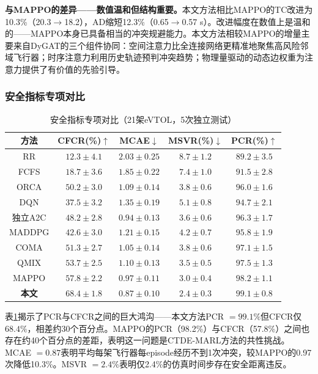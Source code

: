 \documentclass[12pt,a4paper,UTF8]{ctexart}
\begin{document}
\textbf{与MAPPO的差异——数值温和但结构重要。}本文方法相比MAPPO的TC改进为10.3\%（20.3$\to$18.2），AD缩短12.3\%（0.65$\to$0.57 s）。改进幅度在数值上是温和的——MAPPO本身已具备相当的冲突规避能力。本文方法相较MAPPO的增量主要来自DyGAT的三个组件协同：空间注意力比全连接网络更精准地聚焦高风险邻域飞行器；时序注意力利用历史轨迹预判冲突趋势；物理量驱动的动态边权重为注意力提供了有价值的先验引导。

\subsubsection{安全指标专项对比}

\begin{table}[H]
    \centering
    \caption{安全指标专项对比（21架eVTOL，5次独立测试）}
    \label{tab:safety}
    \begin{tabular}{|c|c|c|c|c|}
        \hline
        \textbf{方法} & \textbf{CFCR(\%)$\uparrow$} & \textbf{MCAE$\downarrow$} & \textbf{MSVR(\%)$\downarrow$} & \textbf{PCR(\%)$\uparrow$} \\
        \hline
        RR & $12.3\pm4.1$ & $2.03\pm0.25$ & $8.7\pm1.2$ & $89.2\pm3.5$ \\
        FCFS & $18.7\pm3.6$ & $1.85\pm0.22$ & $7.4\pm1.0$ & $91.5\pm2.8$ \\
        ORCA & $50.2\pm3.0$ & $1.09\pm0.14$ & $3.8\pm0.6$ & $96.0\pm1.6$ \\
        DQN & $37.5\pm3.2$ & $1.35\pm0.19$ & $5.1\pm0.8$ & $94.7\pm2.1$ \\
        独立A2C & $48.2\pm2.8$ & $0.94\pm0.13$ & $3.6\pm0.6$ & $96.3\pm1.7$ \\
        MADDPG & $42.6\pm3.0$ & $1.21\pm0.15$ & $4.2\pm0.7$ & $95.8\pm1.9$ \\
        COMA & $51.3\pm2.7$ & $1.05\pm0.14$ & $3.8\pm0.6$ & $97.1\pm1.5$ \\
        QMIX & $53.7\pm2.5$ & $1.10\pm0.13$ & $3.5\pm0.5$ & $97.5\pm1.3$ \\
        MAPPO & $57.8\pm2.2$ & $0.97\pm0.11$ & $3.0\pm0.4$ & $98.2\pm1.1$ \\
        \textbf{本文} & $\mathbf{68.4\pm1.8}$ & $\mathbf{0.87\pm0.10}$ & $\mathbf{2.4\pm0.3}$ & $\mathbf{99.1\pm0.8}$ \\
        \hline
    \end{tabular}
\end{table}

表\ref{tab:safety}揭示了PCR与CFCR之间的巨大鸿沟——本文方法PCR $=99.1\%$但CFCR仅$68.4\%$，相差约30个百分点。MAPPO的PCR（98.2\%）与CFCR（57.8\%）之间也存在约40个百分点的差距，表明这一问题是CTDE-MARL方法的共性挑战。MCAE $=0.87$表明平均每架飞行器每episode经历不到1次冲突，较MAPPO的0.97次降低10.3\%。MSVR $=2.4\%$表明仅2.4\%的仿真时间步存在安全距离违反。
\end{document}
